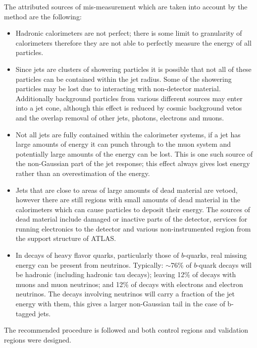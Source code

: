 The attributed sources of mis-measurement which are taken into account by the method are the following:
\begin{itemize}
\item Hadronic calorimeters are not perfect; there is some limit to granularity of calorimeters therefore they are not able to perfectly measure the energy of all particles.
\item Since jets are clusters of showering particles it is possible that not all of these particles can be contained within the jet radius. Some of the showering particles may be lost due to interacting with non-detector material. Additionally background particles from various different sources may enter into a jet cone, although this effect is reduced by cosmic background vetos and the overlap removal of other jets, photons, electrons and muons.
\item Not all jets are fully contained within the calorimeter systems, if a jet has large amounts of energy it can punch through to the muon system and potentially large amounts of the energy can be lost. This is one such source of the non-Gaussian part of the jet response; this effect always gives lost energy rather than an overestimation of the energy.
\item Jets that are close to areas of large amounts of dead material are vetoed, however there are still regions with small amounts of dead material in the calorimeters which can cause particles to deposit their energy. The sources of dead material include damaged or inactive parts of the detector, services for running electronics to the detector and various non-instrumented region from the support structure of ATLAS.
\item In decays of heavy flavor quarks, particularly those of $b$-quarks, real missing energy can be present from neutrinos. Typically: $\sim$76\% of $b$-quark decays will be hadronic (including hadronic tau decays); leaving 12\% of decays with muons and muon neutrinos; and 12\% of decays with electrons and electron neutrinos. The decays involving neutrinos will carry a fraction of the jet energy with them, this gives a larger non-Gaussian tail in the case of b-tagged jets.
\end{itemize}

The recommended procedure is followed and both control regions and validation regions were designed. \\


